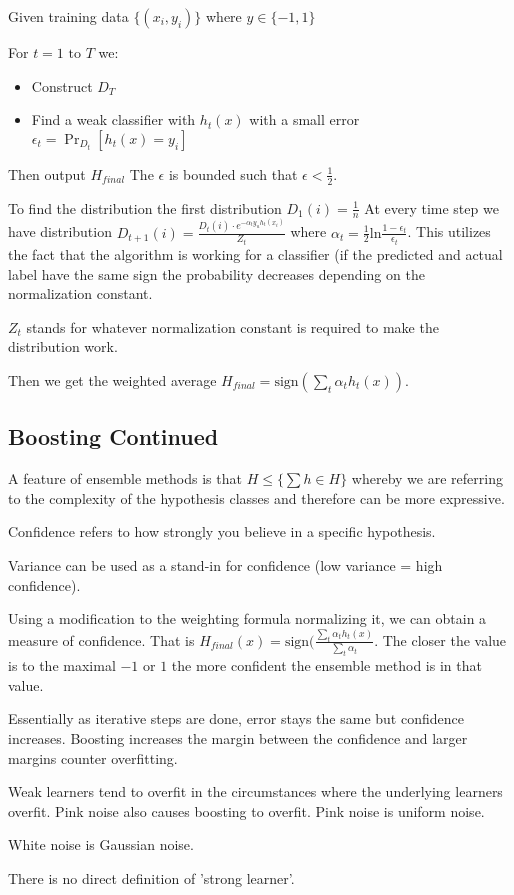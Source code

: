 \documentclass{article}
\begin{document}
Given training data $\{(x_i, y_i)\}$ where $y \in \{-1, 1\}$

For $t = 1 \text{ to } T$ we:
\begin{itemize}
	\item Construct $D_T$
	\item Find a weak classifier with $h_t(x)$ with a small error
		$\epsilon_t = \Pr_{D_t} [h_t(x) = y_i]$
\end{itemize}

Then output $H_{final}$
The $\epsilon$ is bounded such that $\epsilon < \frac{1}{2}$.

To find the distribution the first distribution $D_1(i) = \frac{1}{n}$
At every time step we have distribution $D_{t + 1}(i) = \frac{D_{t}(i) \cdot
e^{-\alpha_ty_uh_t(x_i)}}{Z_t}$ where $\alpha_t = \frac{1}{2}\text{ln}\frac
{1 -\epsilon_t}{\epsilon_t}$. This utilizes the fact that the algorithm is 
working for a classifier (if the predicted and actual label have the same sign 
the probability decreases depending on the normalization constant. 

$Z_t$ stands for whatever normalization constant is required to make the
distribution work. 

Then we get the weighted average $H_{final} = \text{sign}(\sum_t \alpha_th_t
(x))$.

\subsection{Boosting Continued}
A feature of ensemble methods is that $H \leq \{\sum h \in H\}$ whereby we are
referring to the complexity of the hypothesis classes and therefore can be 
more expressive.

Confidence refers to how strongly you believe in a specific hypothesis. 

Variance can be used as a stand-in for confidence (low variance = high
confidence). 

Using a modification to the weighting formula normalizing it, we can obtain a
measure of confidence. That is $H_{final}(x) = \text{sign}(\frac{\sum_t 
\alpha_t h_t(x)}{\sum_t \alpha_t}$. The closer the value is to the maximal $-1$ 
or $1$ the more confident the ensemble method is in that value. 

Essentially as iterative steps are done, error stays the same but confidence
increases. Boosting increases the margin between the confidence and larger 
margins counter overfitting. 

Weak learners tend to overfit in the circumstances where the underlying learners
overfit. Pink noise also causes boosting to overfit. Pink noise is uniform
noise. 

White noise is Gaussian noise. 

There is no direct definition of 'strong learner'.
\end{document}
